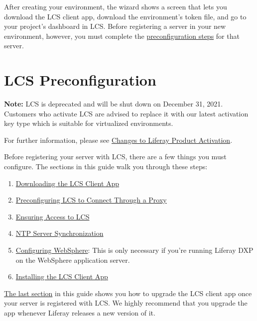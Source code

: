 After creating your environment, the wizard shows a screen that lets you
download the LCS client app, download the environment's token file, and
go to your project's dashboard in LCS. Before registering a server in
your new environment, however, you must complete the
\href{/docs/7-2/deploy/-/knowledge_base/d/lcs-preconfiguration}{preconfiguration
steps} for that server.

\chapter{LCS Preconfiguration}\label{lcs-preconfiguration}

\noindent\hrulefill

\textbf{Note:} LCS is deprecated and will be shut down on December 31,
2021. Customers who activate LCS are advised to replace it with our
latest activation key type which is suitable for virtualized
environments.

For further information, please see
\href{https://help.liferay.com/hc/en-us/articles/4402347960845-Changes-to-Liferay-Product-Activation}{Changes
to Liferay Product Activation}.

\noindent\hrulefill

Before registering your server with LCS, there are a few things you must
configure. The sections in this guide walk you through these steps:

\begin{enumerate}
\def\labelenumi{\arabic{enumi}.}
\tightlist
\item
  \hyperref[downloading-the-lcs-client-app]{Downloading the LCS Client
  App}
\item
  \hyperref[preconfiguring-lcs-to-connect-through-a-proxy]{Preconfiguring
  LCS to Connect Through a Proxy}
\item
  \hyperref[ensuring-access-to-lcs]{Ensuring Access to LCS}
\item
  \hyperref[ntp-server-synchronization]{NTP Server Synchronization}
\item
  \hyperref[configuring-websphere]{Configuring WebSphere}: This is only
  necessary if you're running Liferay DXP on the WebSphere application
  server.
\item
  \hyperref[installing-the-lcs-client-app]{Installing the LCS Client
  App}
\end{enumerate}

\hyperref[upgrading-the-lcs-client-app]{The last section} in this guide
shows you how to upgrade the LCS client app once your server is
registered with LCS. We highly recommend that you upgrade the app
whenever Liferay releases a new version of it.

